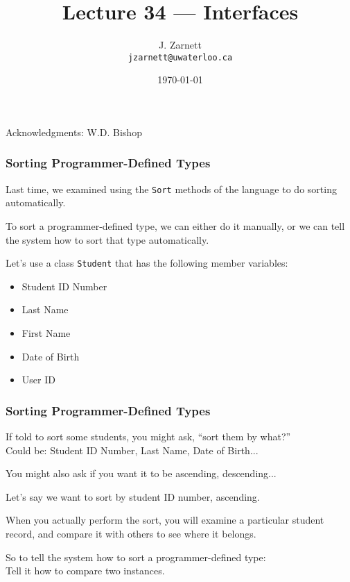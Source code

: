 

\title{Lecture 34 --- Interfaces }

\author{J. Zarnett\\
\texttt{jzarnett@uwaterloo.ca}}
\date{\today}



\begin{frame}
  \titlepage
  
  \begin{center}
  \small{Acknowledgments: W.D. Bishop}
  \end{center}
\end{frame}

\begin{frame}
\frametitle{Sorting Programmer-Defined Types}
Last time, we examined using the \texttt{Sort} methods of the language to do sorting automatically.

To sort a programmer-defined type, we can either do it manually, or we can tell the system how to sort that type automatically.

Let's use a class \texttt{Student} that has the following member variables:
\begin{itemize}
	\item Student ID Number
	\item Last Name
	\item First Name
	\item Date of Birth
	\item User ID
\end{itemize}

\end{frame}

\begin{frame}
\frametitle{Sorting Programmer-Defined Types}

If told to sort some students, you might ask, ``sort them by what?''\\
\quad Could be: Student ID Number, Last Name, Date of Birth...

You might also ask if you want it to be ascending, descending...

Let's say we want to sort by student ID number, ascending.

When you actually perform the sort, you will examine a particular student record, and \alert{compare} it with others to see where it belongs.

So to tell the system how to sort a programmer-defined type:\\
\quad Tell it \alert{how to compare two instances}.

\end{frame}


